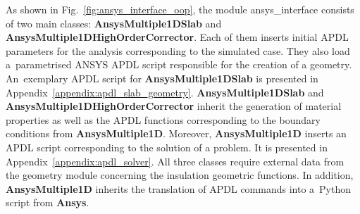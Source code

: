 As shown in Fig.~\ref{fig:ansys_interface_oop}, the module ansys\_interface consists of two main classes: \textbf{AnsysMultiple1DSlab} and \textbf{AnsysMultiple1DHighOrderCorrector}. Each of them inserts initial APDL parameters for the analysis corresponding to the simulated case. They also load a~parametrised ANSYS APDL script responsible for the creation of a geometry. An~exemplary APDL script for \textbf{AnsysMultiple1DSlab} is presented in Appendix~\ref{appendix:apdl_slab_geometry}. \textbf{AnsysMultiple1DSlab} and \textbf{AnsysMultiple1DHighOrderCorrector} inherit the generation of material properties as well as the APDL functions corresponding to the boundary conditions from \textbf{AnsysMultiple1D}. Moreover, \textbf{AnsysMultiple1D} inserts an APDL script corresponding to the solution of a problem. It is presented in Appendix~\ref{appendix:apdl_solver}. All three classes require external data from the geometry module concerning the insulation geometric functions. In addition, \textbf{AnsysMultiple1D} inherits the translation of APDL commands into a~Python script from \textbf{Ansys}.

